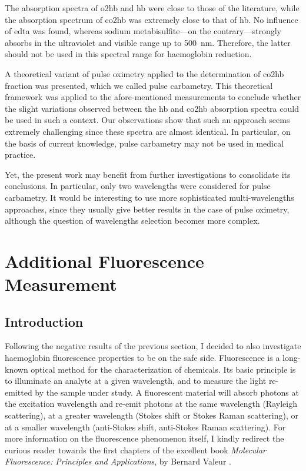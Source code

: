 The absorption spectra of \gls{o2hb} and \gls{hb} were close to those of the literature, while the absorption spectrum of \gls{co2hb} was extremely close to that of \gls{hb}. No influence of \gls{edta} was found, whereas sodium metabisulfite---on the contrary---strongly absorbs in the ultraviolet and visible range up to 500~nm. Therefore, the latter should not be used in this spectral range for haemoglobin reduction.

A theoretical variant of pulse oximetry applied to the determination of \gls{co2hb} fraction was presented, which we called pulse carbametry. This theoretical framework was applied to the afore-mentioned measurements to conclude whether the slight variations observed between the \gls{hb} and \gls{co2hb} absorption spectra could be used in such a context. Our observations show that such an approach seems extremely challenging since these spectra are almost identical. In particular, on the basis of current knowledge, pulse carbametry may not be used in medical practice.

Yet, the present work may benefit from further investigations to consolidate its conclusions. In particular, only two wavelengths were considered for pulse carbametry. It would be interesting to use more sophisticated multi-wavelengths approaches, since they usually give better results in the case of pulse oximetry\cite{katja2011}, although the question of wavelengths selection becomes more complex\cite{brunelle1996, brendel2009}.

\section{Additional Fluorescence Measurement}\label{sect:co2hb:fluo}

\subsection{Introduction}

Following the negative results of the previous section, I decided to also investigate haemoglobin fluorescence properties to be on the safe side. Fluorescence is a long-known optical method for the characterization of chemicals. Its basic principle is to illuminate an analyte at a given wavelength, and to measure the light re-emitted by the sample under study. A fluorescent material will absorb photons at the excitation wavelength and re-emit photons at the same wavelength (Rayleigh scattering), at a greater wavelength (Stokes shift or Stokes Raman scattering), or at a smaller wavelength (anti-Stokes shift, anti-Stokes Raman scattering). For more information on the fluorescence phenomenon itself, I kindly redirect the curious reader towards the first chapters of the excellent book \textit{Molecular Fluorescence: Principles and Applications}, by Bernard Valeur \etal{}\cite{valeur2012molecfluo}.

